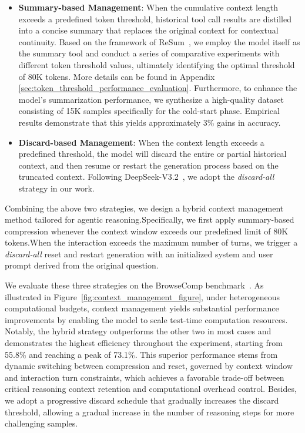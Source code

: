 \documentclass{article}
\begin{document}
\begin{itemize}
\item \textbf{Summary-based Management}:
When the cumulative context length exceeds a predefined token threshold, historical tool call results are distilled into a concise summary that replaces the original context for contextual continuity. Based on the framework of ReSum~\citep{wu2025resum}, we employ the model itself as the summary tool and conduct a series of comparative experiments with different token threshold values, ultimately identifying the optimal threshold of 80K tokens. More details can be found in Appendix \ref{sec:token_threshold_performance_evaluation}. Furthermore, to enhance the model’s summarization performance, we synthesize a high-quality dataset consisting of 15K samples specifically for the cold-start phase. Empirical results demonstrate that this yields approximately 3\% gains in accuracy.

\item \textbf{Discard-based Management}:  
When the context length exceeds a predefined threshold, the model will discard the entire or partial historical context, and then resume or restart the generation process based on the truncated context. Following DeepSeek-V3.2~\citep{DeepSeek-V3.2}, we adopt the \emph{discard-all} strategy in our work.

\end{itemize}

Combining the above two strategies, we design a hybrid context management method tailored for agentic reasoning.Specifically, we first apply summary-based compression whenever the context window exceeds our predefined limit of 80K tokens.When the interaction exceeds the maximum number of turns,  we trigger a \emph{discard-all} reset and restart generation with an initialized system and user prompt derived from the original question. 

We evaluate these three strategies on the BrowseComp benchmark~\citep{BrowseComp}. As illustrated in Figure~\ref{fig:context_management_figure}, under heterogeneous computational budgets, context management yields substantial performance improvements by enabling the model to scale test-time computation resources. Notably, the hybrid strategy outperforms the other two in most cases and demonstrates the highest efficiency throughout the experiment, starting from 55.8\% and reaching a peak of 73.1\%. This superior performance stems from dynamic switching between compression and reset, governed by context window and interaction turn constraints, which achieves a favorable trade-off between critical reasoning context retention and computational overhead control. Besides, we adopt a progressive discard schedule that gradually increases the discard threshold, allowing a gradual increase in the number of reasoning steps for more challenging samples.
\end{document}
